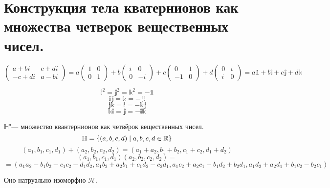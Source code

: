 \section{Конструкция тела кватернионов как множества четверок вещественных чисел.}
$$\left(\begin{matrix}a + bi & c+di \\ -c+di & a-bi\end{matrix}\right) = a \left(\begin{matrix}1 & 0 \\ 0 & 1\end{matrix}\right) + b \left(\begin{matrix}i & 0 \\ 0 & -i\end{matrix}\right) + c\left(\begin{matrix}0 & 1 \\ -1 & 0\end{matrix}\right) + d\left(\begin{matrix}0 & i \\ i & 0\end{matrix}\right) = a\mathbb{1} + b\mathbb{i} + c\mathbb{j} + d\mathbb{k}$$

$$\mathbb{i}^2 = \mathbb{j}^2 = \mathbb{k}^2 = -\mathbb{1}$$
$$\mathbb{ij} = \mathbb{k} = -\mathbb{ji}$$
$$\mathbb{jk} = \mathbb{i} = -\mathbb{kj}$$
$$\mathbb{ki} = \mathbb{j} = -\mathbb{ik}$$

\begin{Def}
$\mathbb{H}$"--- множество квантернионов как четвёрок вещественных чисел.
$$\mathbb{H} = \left\{(a, b, c, d) \mid a, b, c, d \in \mathbb{R}\right\}$$
$$(a_1, b_1, c_1, d_1) + (a_2, b_2, c_2, d_2) = (a_1 + a_2, b_1 + b_2, c_1 + c_2, d_1 + d_2)$$
$$(a_1, b_1, c_1, d_1) (a_2, b_2, c_2, d_2) = $$
$$ = (a_1a_2 - b_1b_2 - c_1c_2 - d_1d_2, a_1b_2 + a_2b_1 + c_1d_2 - c_2d_1, a_1c_2 + a_2c_1 - b_1d_2 + b_2d_1, a_1d_2 + a_2d_1 + b_1c_2 - b_2c_1)$$
\end{Def}
Оно натруально изоморфно $\mathcal{H}$.